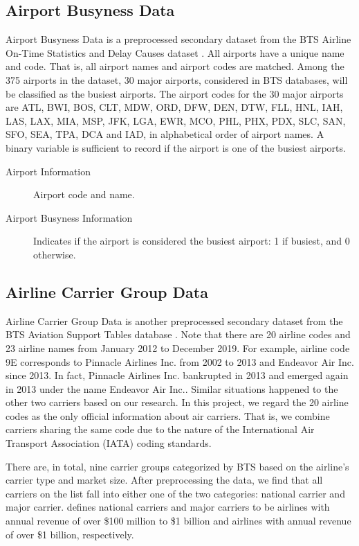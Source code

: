 \documentclass[11pt]{article}
\begin{document}
\subsection{Airport Busyness Data}
Airport Busyness Data is a preprocessed secondary dataset from the BTS Airline On-Time Statistics and Delay Causes dataset \citep{web:bts2}. All airports have a unique name and code. That is, all airport names and airport codes are matched. Among the 375 airports in the dataset, 30 major airports, considered in BTS databases, will be classified as the busiest airports. The airport codes for the 30 major airports are ATL, BWI, BOS, CLT, MDW, ORD, DFW, DEN, DTW, FLL, HNL, IAH, LAS, LAX, MIA, MSP, JFK, LGA, EWR, MCO, PHL, PHX, PDX, SLC, SAN, SFO, SEA, TPA, DCA and IAD, in alphabetical order of airport names. A binary variable is sufficient to record if the airport is one of the busiest airports.

\begin{description}
\item [Airport Information] Airport code and name.
\item [Airport Busyness Information] Indicates if the airport is considered the busiest airport: 1 if busiest, and 0 otherwise.
\end{description}

\subsection{Airline Carrier Group Data}\label{sec:acgd}
Airline Carrier Group Data is another preprocessed secondary dataset from the BTS Aviation Support Tables database \citep{web:bts3}. Note that there are 20 airline codes and 23 airline names from January 2012 to December 2019. For example, airline code 9E corresponds to Pinnacle Airlines Inc. from 2002 to 2013 and Endeavor Air Inc. since 2013. In fact, Pinnacle Airlines Inc. bankrupted in 2013 and emerged again in 2013 under the name Endeavor Air Inc.. Similar situations happened to the other two carriers based on our research. In this project, we regard the 20 airline codes as the only official information about air carriers. That is, we combine carriers sharing the same code due to the nature of the International Air Transport Association (IATA) coding standards. 

There are, in total, nine carrier groups categorized by BTS based on the
airline’s carrier type and market size. After preprocessing the data, we find that all carriers on the list fall into either one of the two categories: national carrier and major carrier. \citet{web:bts3} defines national carriers and major carriers to be airlines with annual revenue of over \$100 million to \$1 billion and airlines with annual revenue of over \$1 billion, respectively.
\end{document}
